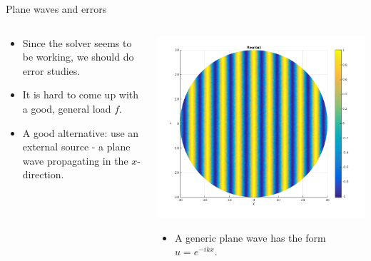 \documentclass{beamer}
\begin{document}
\begin{frame}{Plane waves and errors}
\begin{columns}
  \begin{column}{0.39\textwidth}
    \begin{itemize}
    \item Since the solver seems to be working, we should do error studies.
    \item It is hard to come up with a good, general load $f$.
    \item A good alternative: use an external source - a plane wave propagating in the $x$-direction.
    \end{itemize}        
  \end{column}
  \begin{column}{0.61\textwidth}
    \begin{center}
    \includegraphics[width=\textwidth]{planewave_real.png}
    \begin{itemize}
    \item A generic plane wave has the form $u = e^{-ikx}$.
    \end{itemize}
    \end{center}
  \end{column}
\end{columns}
\end{frame}
\end{document}
